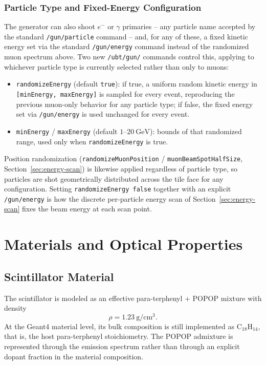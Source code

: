 \subsubsection{Particle Type and Fixed-Energy Configuration}
The generator can also shoot $e^-$ or $\gamma$ primaries -- any particle
name accepted by the standard \texttt{/gun/particle} command -- and, for any
of these, a fixed kinetic energy set via the standard \texttt{/gun/energy}
command instead of the randomized muon spectrum above. Two new
\texttt{/ubt/gun/} commands control this, applying to whichever particle
type is currently selected rather than only to muons:
\begin{itemize}
\item \texttt{randomizeEnergy} (default \texttt{true}): if true, a uniform
random kinetic energy in \texttt{[minEnergy, maxEnergy]} is sampled for
every event, reproducing the previous muon-only behavior for any particle
type; if false, the fixed energy set via \texttt{/gun/energy} is used
unchanged for every event.
\item \texttt{minEnergy} / \texttt{maxEnergy} (default $1$--$20~\mathrm{GeV}$):
bounds of that randomized range, used only when \texttt{randomizeEnergy} is
true.
\end{itemize}
Position randomization (\texttt{randomizeMuonPosition} /
\texttt{muonBeamSpotHalfSize}, Section~\ref{sec:energy-scan}) is likewise
applied regardless of particle type, so particles are shot geometrically
distributed across the tile face for any configuration. Setting
\texttt{randomizeEnergy false} together with an explicit \texttt{/gun/energy}
is how the discrete per-particle energy scan of
Section~\ref{sec:energy-scan} fixes the beam energy at each scan point.

\section{Materials and Optical Properties}
\subsection{Scintillator Material}
The scintillator is modeled as an effective para-terphenyl + POPOP mixture with density
\[
\rho = 1.23~\mathrm{g/cm^3}.
\]
At the Geant4 material level, its bulk composition is still implemented as $\mathrm{C}_{18}\mathrm{H}_{14}$, that is, the host para-terphenyl stoichiometry. The POPOP admixture is represented through the emission spectrum rather than through an explicit dopant fraction in the material composition.

